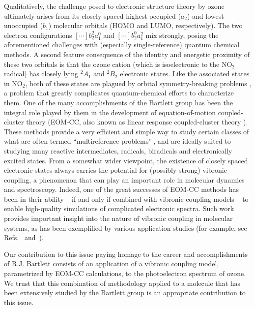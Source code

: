 \documentclass[12pt,a4paper,prb,aps,superscriptaddress]{revtex4}
\begin{document}
Qualitatively, the challenge posed to electronic structure theory by ozone
ultimately arises from its closely spaced highest-occupied ($a_2$) and
lowest-unoccupied ($b_1$) molecular orbitals (HOMO and LUMO, respectively).
The two electron configurations $[\cdots]b_2^2 a_1^0$ and $[\cdots]b_2^0
a_1^2$ mix strongly, posing the aforementioned challenges with (especially
single-reference) quantum chemical methods.   A second feature consequence of
the identity and energetic proximity of these two orbitals is that the ozone
cation (which is isoelectronic to the NO$_2$ radical) has closely lying
$^2A_1$ and $^2B_2$ electronic states.   Like the associated states in NO$_2$,
both of these states are plagued by orbital symmetry-breaking problems
\cite{Davidson:SymmBreak:76}, a problem that greatly complicates
quantum-chemical efforts to characterize them.   One of the many
accomplishments of the Bartlett group has been the integral role played by
them in the development of equation-of-motion coupled-cluster theory
\cite{Stanton:93:EOMCC, Nooijen:EOMEA:95, Bartlett:CC_review:07} (EOM-CC, also
known as linear response coupled-cluster theory \cite{Koch:90:LinResp}). These
methods provide a very efficient and simple way to study certain classes of
what are often termed ``multireference problems" \cite{Krylov:EOMRev:07}, and
are ideally suited to studying many reactive intermediates, radicals,
biradicals and electronically excited states.   From a somewhat wider
viewpoint, the existence of closely spaced electronic states always carries
the potential for (possibly strong) vibronic coupling, a phenomenon that can
play an important role in molecular dynamics and spectroscopy.  Indeed, one of
the great successes of EOM-CC methods has been in their ability -- if and only
if combined with vibronic coupling models -- to enable high-quality
simulations of complicated electronic spectra.   Such work provides important
insight into the nature of vibronic coupling in molecular systems, as has been
exemplified by various application studies (for example, see
Refs.~\cite{Stanton:NO3:07} and~\cite{Koppel:02}).

Our contribution to this issue paying homage to the career and accomplishments
of R.J. Bartlett consists of an application of a vibronic coupling model,
parametrized by EOM-CC calculations, to the photoelectron spectrum of ozone.
We trust that this combination of methodology applied to a molecule that has
been extensively studied by the Bartlett group is an appropriate contribution
to this issue.
\end{document}
